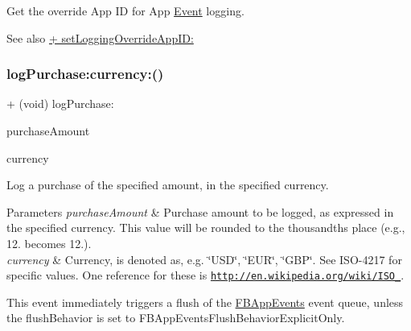 Get the \textquotesingle{}override\textquotesingle{} App ID for App \hyperlink{classEvent}{Event} logging.

\begin{DoxySeeAlso}{See also}
{\ttfamily \hyperlink{interfaceFBAppEvents_a3f9d06a1e8b3d482efc5c438827fbc6e}{+ set\+Logging\+Override\+App\+I\+D\+:}} 
\end{DoxySeeAlso}
\mbox{\label{interfaceFBAppEvents_a871b481d919104f7dbb67247b682e0fa}} 
\subsubsection{\texorpdfstring{log\+Purchase\+:currency\+:()}{logPurchase:currency:()}\hspace{0.1cm}{\footnotesize\ttfamily [1/5]}}
{\footnotesize\ttfamily + (void) log\+Purchase\+: \begin{DoxyParamCaption}\item[{(double)}]{purchase\+Amount }\item[{currency:(N\+S\+String $\ast$)}]{currency }\end{DoxyParamCaption}}

Log a purchase of the specified amount, in the specified currency.


\begin{DoxyParams}{Parameters}
{\em purchase\+Amount} & Purchase amount to be logged, as expressed in the specified currency. This value will be rounded to the thousandths place (e.\+g., 12. becomes 12.).\\
\hline
{\em currency} & Currency, is denoted as, e.\+g. \char`\"{}\+U\+S\+D\char`\"{}, \char`\"{}\+E\+U\+R\char`\"{}, \char`\"{}\+G\+B\+P\char`\"{}. See I\+S\+O-\/4217 for specific values. One reference for these is \href{http://en.wikipedia.org/wiki/ISO_4217}{\tt http\+://en.\+wikipedia.\+org/wiki/\+I\+S\+O\+\_}.\\
\hline
\end{DoxyParams}
This event immediately triggers a flush of the {\ttfamily \hyperlink{interfaceFBAppEvents}{F\+B\+App\+Events}} event queue, unless the {\ttfamily flush\+Behavior} is set to {\ttfamily F\+B\+App\+Events\+Flush\+Behavior\+Explicit\+Only}. \mbox{\label{interfaceFBAppEvents_a871b481d919104f7dbb67247b682e0fa}} 
